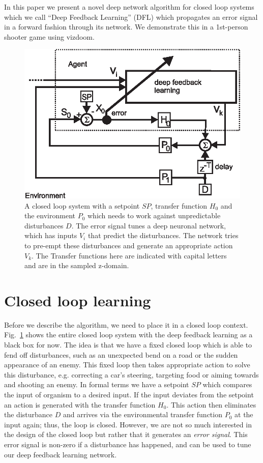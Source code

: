 \documentclass{article}
\begin{document}
In this paper we present a novel deep network algorithm for closed
loop systems which we call ``Deep Feedback Learning'' (DFL) which
propagates an error signal in a forward fashion through its network.
We demonstrate this in a 1st-person shooter game using vizdoom.

\begin{figure}[!ht]
  \centering
  \includegraphics[width=0.75\columnwidth]{closed_loop}
  \caption{A closed loop system with a setpoint $SP$, transfer function $H_0$ and the
    environment $P_0$ which needs to work against unpredictable disturbances $D$.
    The error signal tunes a deep neuronal network, which has inputs
    $V_i$ that predict the disturbances. The network tries to pre-empt these
    disturbances and generate an appropriate action $V_k$. The Transfer
    functions here are indicated with capital letters and are in the
    sampled z-domain.
    \label{closed_loop}}
\end{figure}

\section{Closed loop learning}
Before we describe the algorithm, we need to place it in a closed loop
context. Fig.~\ref{closed_loop} shows the entire closed loop system
with the deep feedback learning as a black box for now. The idea is
that we have a fixed closed loop which is able to fend off
disturbances, such as an unexpected bend on a road or the sudden
appearance of an enemy. This fixed loop then takes appropriate action
to solve this disturbance, e.g. correcting a car's steering, targeting
food or aiming towards and shooting an enemy. In formal terms we have
a setpoint $SP$ which compares the input of organism to a desired
input. If the input deviates from the setpoint an action is generated
with the transfer function $H_0$. This action then eliminates the
disturbance $D$ and arrives via the environmental transfer function
$P_0$ at the input again; thus, the loop is closed. However, we are
not so much interested in the design of the closed loop but rather
that it generates an \textsl{error signal}. This error signal is
non-zero if a disturbance has happened, and can be used to tune our
deep feedback learning network.
\end{document}
